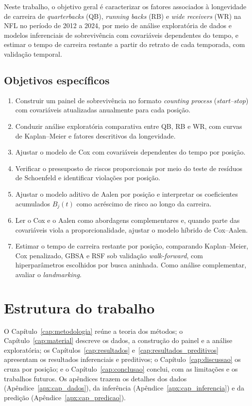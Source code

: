 Neste trabalho, o objetivo geral é caracterizar os fatores associados à longevidade de carreira de \textit{quarterbacks} (QB), \textit{running backs} (RB) e \textit{wide receivers} (WR) na NFL no período de 2012 a 2024, por meio de análise exploratória de dados e modelos inferenciais de sobrevivência com covariáveis dependentes do tempo, e estimar o tempo de carreira restante a partir do retrato de cada temporada, com validação temporal.

\subsection*{Objetivos específicos}

\begin{enumerate}
  \item Construir um painel de sobrevivência no formato \textit{counting process} (\textit{start--stop}) com covariáveis atualizadas anualmente para cada posição.
  \item Conduzir análise exploratória comparativa entre QB, RB e WR, com curvas de Kaplan--Meier e fatores descritivos da longevidade.
  \item Ajustar o modelo de Cox com covariáveis dependentes do tempo por posição.
  \item Verificar o pressuposto de riscos proporcionais por meio do teste de resíduos de Schoenfeld e identificar violações por posição.
  \item Ajustar o modelo aditivo de Aalen por posição e interpretar os coeficientes acumulados $B_j(t)$ como acréscimo de risco ao longo da carreira.
  \item Ler o Cox e o Aalen como abordagens complementares e, quando parte das covariáveis viola a proporcionalidade, ajustar o modelo híbrido de Cox--Aalen.
  \item Estimar o tempo de carreira restante por posição, comparando Kaplan--Meier, Cox penalizado, GBSA e RSF sob validação \textit{walk-forward}, com hiperparâmetros escolhidos por busca aninhada. Como análise complementar, avaliar o \textit{landmarking}.
\end{enumerate}


\section{Estrutura do trabalho}

O Capítulo~\ref{cap:metodologia} reúne a teoria dos métodos; o Capítulo~\ref{cap:material} descreve os dados, a construção do painel e a análise exploratória; os Capítulos~\ref{cap:resultados} e~\ref{cap:resultados_preditivos} apresentam os resultados inferenciais e preditivos; o Capítulo~\ref{cap:discussao} os cruza por posição; e o Capítulo~\ref{cap:conclusao} conclui, com as limitações e os trabalhos futuros. Os apêndices trazem os detalhes dos dados (Apêndice~\ref{apx:cap_dados}), da inferência (Apêndice~\ref{apx:cap_inferencia}) e da predição (Apêndice~\ref{apx:cap_predicao}).
